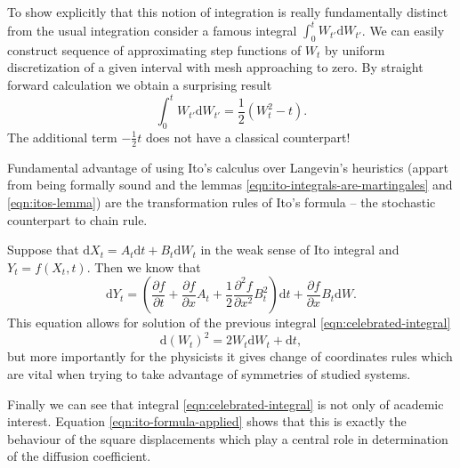 \documentclass{doctoral}
\newcommand{\pd}{\partial}
\newcommand{\dd}{\mathrm{d}}
\begin{document}
To show explicitly that this notion of integration is really fundamentally distinct from the usual integration consider a famous integral $\int_0^t W_{t'} \dd W_{t'}$. We can easily construct sequence of approximating step functions of $W_{t}$ by uniform discretization of a given interval with mesh approaching to zero. By straight forward calculation we obtain a surprising result
\begin{equation}
    \int_{0}^{t} W_{t'} \dd W_{t'} = \frac{1}{2} \left( W_t^2 - t \right).
    \label{eqn:celebrated-integral}
\end{equation}
The additional term $-\frac{1}{2}t$ does not have a classical counterpart!

Fundamental advantage of using Ito's calculus over Langevin's heuristics (appart from being formally sound and the lemmas \eqref{eqn:ito-integrals-are-martingales} and \eqref{eqn:itos-lemma}) are the transformation rules of Ito's formula -- the stochastic counterpart to chain rule.

Suppose that $\dd X_t = A_t \dd t + B_t \dd W_t$ in the weak sense of Ito integral and $Y_t = f(X_t,t)$. Then we know that
\begin{equation}
    \dd Y_t = \left( \frac{\pd f}{\pd t} + \frac{\pd f}{\pd x} A_t + \frac{1}{2} \frac{\pd^2 f}{\pd x^2} B_t^2 \right) \dd t + \frac{\pd f}{\pd x} B_t \dd W.
    \label{eqn:itos-formula}
\end{equation}
This equation allows for solution of the previous integral \eqref{eqn:celebrated-integral}
\begin{equation}
    \dd (W_t)^2 = 2 W_t \dd W_t + \dd t,
    \label{eqn:ito-formula-applied}
\end{equation}
but more importantly for the physicists it gives change of coordinates rules which are vital when trying to take advantage of symmetries of studied systems.

Finally we can see that integral \eqref{eqn:celebrated-integral} is not only of academic interest. Equation \eqref{eqn:ito-formula-applied} shows that this is exactly the behaviour of the square displacements which play a central role in determination of the diffusion coefficient.

\end{document}
